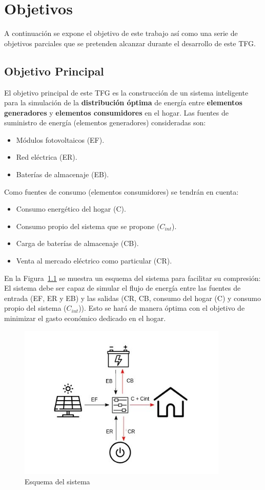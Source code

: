 \chapter{Objetivos}
\label{cap:Objetivo}
A continuación se expone el objetivo de este trabajo así como una serie de objetivos parciales que se pretenden alcanzar durante el desarrollo de este \gls{TFG}.
\section{Objetivo Principal}
El objetivo principal de este \gls{TFG} es la construcción de un sistema inteligente para la simulación de la \textbf{distribución óptima} de energía entre \textbf{elementos generadores} y \textbf{elementos consumidores} en el hogar. Las fuentes de suministro de energía (elementos generadores) consideradas son:
\begin{itemize}
	\item Módulos fotovoltaicos (\gls{EF}).
	\item Red eléctrica (\gls{ER}).
	\item Baterías de almacenaje (\gls{EB}).
\end{itemize}
Como fuentes de consumo (elementos consumidores) se tendrán en cuenta:
\begin{itemize}
	\item Consumo energético del hogar (C).
	\item Consumo propio del sistema que se propone ($ C_{int} $).
	\item Carga de baterías de almacenaje (\gls{CB}).
	\item Venta al mercado eléctrico como particular (\gls{CR}).
\end{itemize}
En la Figura~\ref{fig:schema} se muestra un esquema del sistema para facilitar su compresión: El sistema debe ser capaz de simular el flujo de energía entre las fuentes de entrada (\gls{EF}, \gls{ER} y \gls{EB}) y las salidas (\gls{CR}, \gls{CB}, consumo del hogar (C) y consumo propio del sistema ($ C_{int} $)). Esto se hará de manera óptima con el objetivo de minimizar el gasto económico dedicado en el hogar.

\begin{figure}[H]
	\centering
	\includegraphics[width=10cm]{figs/System.jpg}
	\caption{Esquema del sistema}
        \label{fig:schema}
\end{figure}

